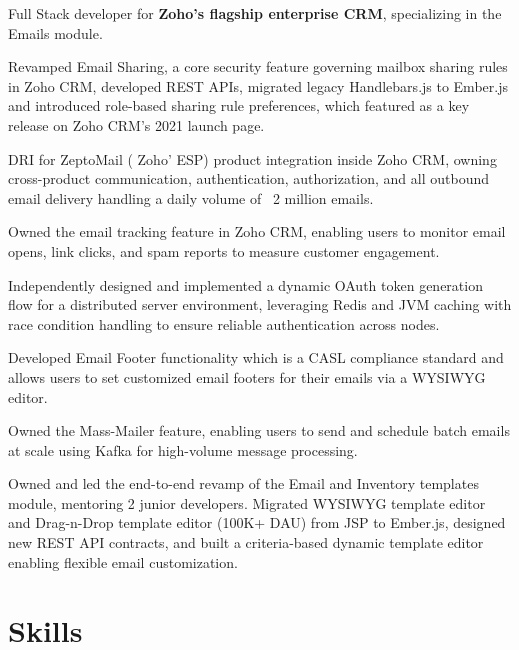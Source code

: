 \documentclass[11pt]{plushcv}
\begin{document}
\begin{tightemize}
\item Full Stack developer for \textbf{Zoho's flagship enterprise CRM}, specializing in the Emails module.
\item Revamped Email Sharing, a core security feature governing mailbox sharing rules in Zoho CRM, developed REST APIs, migrated legacy Handlebars.js to Ember.js and introduced role-based sharing rule preferences, which featured as a key release on Zoho CRM's 2021 launch page.
\item DRI for ZeptoMail ( Zoho' ESP) product integration inside Zoho CRM, owning cross-product communication, authentication, authorization, and all outbound email delivery handling a daily volume of ~2 million emails.
\item Owned the email tracking feature in Zoho CRM, enabling users to monitor email opens, link clicks, and spam reports to measure customer engagement.
\item Independently designed and implemented a dynamic OAuth token generation flow for a distributed server environment, leveraging Redis and JVM caching with race condition handling to ensure reliable authentication across nodes.
\item Developed Email Footer functionality which is a CASL compliance standard and allows users to set customized email footers for their emails via a WYSIWYG editor.
\item Owned the Mass-Mailer feature, enabling users to send and schedule batch emails at scale using Kafka for high-volume message processing.
\item Owned and led the end-to-end revamp of the Email and Inventory templates module, mentoring 2 junior developers. Migrated WYSIWYG template editor and Drag-n-Drop template editor (100K+ DAU) from JSP to Ember.js, designed new REST API contracts, and built a criteria-based dynamic template editor enabling flexible email customization. 
\end{tightemize}

\sectionsep


\section{Skills}
\end{document}
